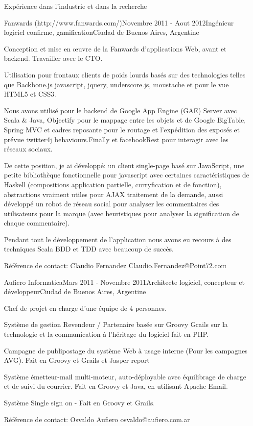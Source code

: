 \documentclass{resume} %
\begin{document}
\begin{rSection}{Exp\'{e}rience dans l'industrie et dans la recherche}
\begin{rSubsection}{Fanwards (http://www.fanwards.com/)}{Novembre 2011 - Aout 2012}{Ing\'{e}nieur logiciel confirme, gamification}{Ciudad de Buenos Aires, Argentine}
	\item Conception et mise en œuvre de la Fanwards d'applications Web, avant et backend. Travailler avec le CTO.
	\item Utilisation pour frontaux clients de poids lourds bas\'{e}s sur des technologies telles que Backbone.js javascript, jquery, underscore.js, moustache et pour le vue HTML5 et CSS3.
	\item Nous avons utilis\'{e} pour le backend de Google App Engine (GAE) Server avec Scala \& Java, Objectify pour le mappage entre les objets et de Google BigTable, Spring MVC et cadres reposante pour le routage et l'exp\'{e}dition des expos\'{e}s et pr\'{e}vue twitter4j behaviours.Finally et facebookRest pour interagir avec les r\'{e}seaux sociaux.
	\item De cette position, je ai d\'{e}velopp\'{e}: un client single-page bas\'{e} sur JavaScript, une petite biblioth\`{e}que fonctionnelle pour javascript avec certaines caract\'{e}ristiques de Haskell (compositions application partielle, curryfication et de fonction), abstractions vraiment utiles pour AJAX traitement de la demande, aussi d\'{e}velopp\'{e} un robot de r\'{e}seau social pour analyser les commentaires des utilisateurs pour la marque (avec heuristiques pour analyser la signification de chaque commentaire).
	
	\item Pendant tout le d\'{e}veloppement de l'application nous avons eu recours \`{a} des techniques Scala BDD et TDD avec beaucoup de succ\`{e}s.
	
	\item R\'{e}f\'{e}rence de contact: Claudio Fernandez Claudio.Fernandez@Point72.com
\end{rSubsection}



\begin{rSubsection}{Aufiero Informatica}{Mars 2011 - Novembre 2011}{Architecte logiciel, concepteur et d\'{e}veloppeur}{Ciudad de Buenos Aires, Argentine}
	\item Chef de projet en charge d'une \'{e}quipe de 4 personnes.
	\item Syst\`{e}me de gestion Revendeur / Partenaire bas\'{e}e sur Groovy Grails sur la technologie et la communication \`{a} l'h\'{e}ritage du logiciel fait en PHP.
	\item Campagne de publipostage du syst\`{e}me Web \`{a} usage interne (Pour les campagnes AVG). Fait en Groovy et Grails et Jasper report
	\item Syst\`{e}me \'{e}metteur-mail multi-moteur, auto-d\'{e}ployable avec \'{e}quilibrage de charge et de suivi du courrier. Fait en Groovy et Java, en utilisant Apache Email.
	\item Syst\`{e}me Single sign on -  Fait en Groovy et Grails.
	\item R\'{e}f\'{e}rence de contact: Osvaldo Aufiero osvaldo@aufiero.com.ar
\end{rSubsection}



\end{rSection}
\end{document}
